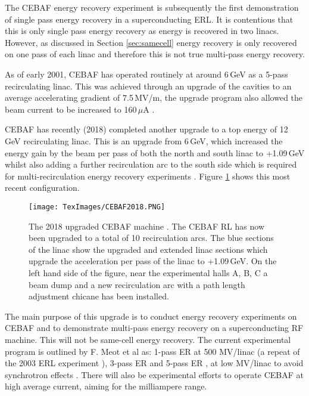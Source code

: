 \documentclass[11pt]{article}
\begin{document}
The CEBAF energy recovery experiment is subsequently the first demonstration of single pass energy recovery in a superconducting ERL. It is contentious that this is only single pass energy recovery as energy is recovered in two linacs. However, as discussed in Section \ref{sec:samecell} energy recovery is only recovered on one pass of each linac and therefore this is not true multi-pass energy recovery.

As of early 2001, CEBAF has operated routinely at around 6\,GeV \cite{CEBAFYChao} as a 5-pass recirculating linac. This was achieved through an upgrade of the cavities to an average accelerating gradient of 7.5\,MV/m, the upgrade program also allowed the beam current to be increased to 160\,$\mu$A \cite{CEBAFLeemann}. 

CEBAF has recently (2018) completed another upgrade to a top energy of 12\,GeV recirculating linac. This is an upgrade from 6\,GeV, which increased the energy gain by the beam per pass of both the north and south linac to +1.09\,GeV whilst also adding a further recirculation arc to the south side which is required for multi-recirculation energy recovery experiments \cite{CEBAFFMeot}. Figure \ref{fig:CEBAF2018} shows this most recent configuration.

\begin{figure}[H]
\centering
\texttt{[image: TexImages/CEBAF2018.PNG]}
\caption{\label{fig:CEBAF2018} The 2018 upgraded CEBAF machine \cite{CEBAFFMeot}. The CEBAF RL has now been upgraded to a total of 10 recirculation arcs. The blue sections of the linac show the upgraded and extended linac sections which upgrade the acceleration per pass of the linac to +1.09\,GeV. On the left hand side of the figure, near the experimental halls A, B, C a beam dump and a new recirculation arc with a path length adjustment chicane has been installed.}
\end{figure} 

The main purpose of this upgrade is to conduct energy recovery experiments on CEBAF and to demonstrate multi-pass energy recovery on a superconducting RF machine. This will not be same-cell energy recovery. The current experimental program is outlined by F. Meot et al as: 1-pass ER at 500 MV/linac (a repeat of the 2003 ERL experiment \cite{CEBAF1stER}), 3-pass ER and 5-pass ER  , at low MV/linac to avoid synchrotron effects \cite{CEBAFFMeot}. There will also be experimental efforts to operate CEBAF at high average current, aiming for the milliampere range.   
\end{document}
